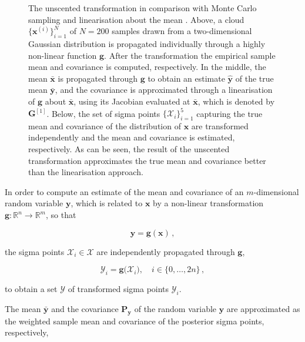 \begin{figure}
\begin{tikzpicture}[scale=1.0, auto, thick, node distance=3cm,>=latex']
\end{tikzpicture}
\caption[The unscented transformation in comparison with Monte Carlo simulation and linearisation about the mean.]{The unscented transformation in comparison with Monte Carlo sampling and linearisation about the mean \cite{wan2001unscented}. Above, a cloud $\big\{\bm{x}^{(i)}\big\}_{i=1}^N$ of $N = 200$ samples drawn from a two-dimensional Gaussian distribution is propagated individually through a highly non-linear function $\bm{g}$. After the transformation the empirical sample mean and covariance is computed, respectively. In the middle, the mean $\bar{\bm{x}}$ is propagated through $\bm{g}$ to obtain an estimate $\hat{\bm{y}}$ of the true mean $\bar{\bm{y}}$, and the covariance is approximated through a linearisation of $\bm{g}$ about $\bar{\bm{x}}$, using its Jacobian evaluated at $\bar{\bm{x}}$, which is denoted by $\bm{G}^{[1]}$. Below, the set of sigma points $\big\{\mathcal{X}_i\big\}_{i=1}^5$ capturing the true mean and covariance of the distribution of $\bm{x}$ are transformed independently and the mean and covariance is estimated, respectively. As can be seen, the result of the unscented transformation approximates the true mean and covariance better than the linearisation approach.}
	\label{fig:unscented_transform}
\end{figure}

In order to compute an estimate of the mean and covariance of an $m$-dimensional random variable $\bm{y}$, which is related to $\bm{x}$ by a non-linear transformation $\bm{g}: \mathbb{R}^{n} \rightarrow \mathbb{R}^{m}$, so that
 
\begin{equation}
  \bm{y} = \bm{g}(\bm{x})\,,
\end{equation}

\noindent
the sigma points $\mathcal{X}_i \in \bm{\mathcal{X}}$ are independently propagated through $\bm{g}$,

\begin{equation}
  \mathcal{Y}_i = \bm{g}\big(\mathcal{X}_i\big), \quad i \in \{0, \dots, 2n\}\,,
\end{equation}

\noindent
 to obtain a set $\bm{\mathcal{Y}}$ of transformed sigma points $\mathcal{Y}_i$.
 
 The mean $\bar{\bm{y}}$ and the covariance $\bm{P}_{\bm{y}}$ of the random variable $\bm{y}$ are approximated as the weighted sample mean and covariance of the posterior sigma points, respectively,

